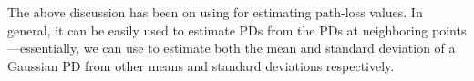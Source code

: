 The above discussion has been on using \ildw for estimating path-loss
values. In general, it can be easily used to estimate PDs from the PDs
at neighboring points---essentially, we can use \ildw to estimate both
the mean and standard deviation of a Gaussian PD from other means and
standard deviations respectively.



